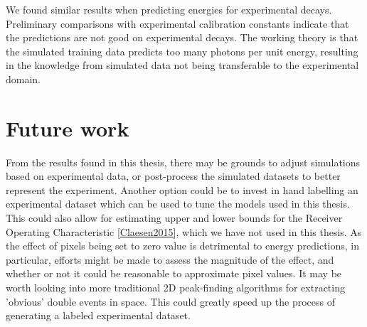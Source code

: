 We found similar results when predicting energies for experimental decays. Preliminary comparisons
with experimental calibration constants indicate that the predictions are not good on experimental
decays. The working theory is that the simulated training data predicts too many photons per unit
energy, resulting in the knowledge from simulated data not being transferable to the experimental
domain.

\section{Future work}
From the results found in this thesis, there may be grounds to adjust simulations based on
experimental data, or post-process the simulated datasets to better represent the experiment.
Another option could be to invest in hand labelling an experimental dataset which can be used
to tune the models used in this thesis. This could also allow for estimating upper and lower bounds
for the Receiver Operating Characteristic \ref{Claesen2015}, which we have not used in this thesis.
As the effect of pixels being set to zero value is detrimental to energy predictions, in particular,
efforts might be made to assess the magnitude of the effect, and whether or not it could be reasonable
to approximate pixel values. It may be worth looking into more traditional 2D peak-finding algorithms
for extracting 'obvious' double events in space. This could greatly speed up the process of generating a
labeled experimental dataset.